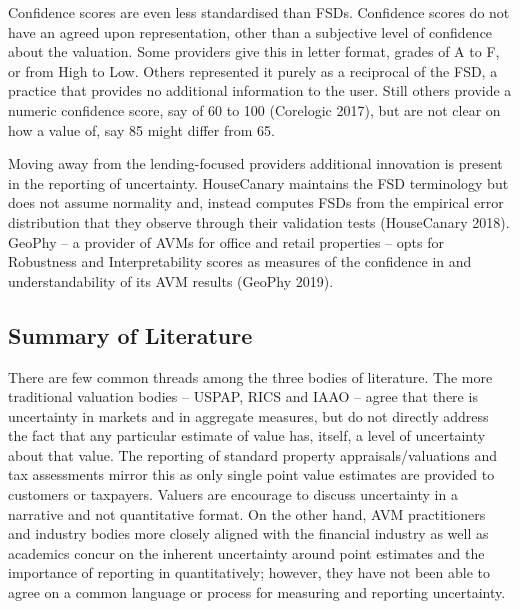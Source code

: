 \documentclass[colTwo]{anon}
\theoremstyle{definition}
\begin{document}
Confidence scores are even less standardised than FSDs.  Confidence scores do not have an agreed upon representation, other than a subjective level of confidence about the valuation.  Some providers give this in letter format, grades of A to F, or from High to Low.  Others represented it purely as a reciprocal of the FSD, a practice that provides no additional information to the user.  Still others provide a numeric confidence score, say of 60 to 100 (Corelogic 2017), but are not clear on how a value of, say 85 might differ from 65.

Moving away from the lending-focused providers additional innovation is present in the reporting of uncertainty.  HouseCanary maintains the FSD terminology but does not assume normality and, instead computes FSDs from the empirical error distribution that they observe through their validation tests (HouseCanary 2018).  GeoPhy -- a provider of AVMs for office and retail properties -- opts for Robustness and Interpretability scores as measures of the confidence in and understandability of its AVM results (GeoPhy 2019).

\subsection{Summary of Literature}

There are few common threads among the three bodies of literature.  The more traditional valuation bodies -- USPAP, RICS and IAAO -- agree that there is uncertainty in markets and in aggregate measures, but do not directly address the fact that any particular estimate of value has, itself, a level of uncertainty about that value.  The reporting of standard property appraisals/valuations and tax assessments mirror this as only single point value estimates are provided to customers or taxpayers. Valuers are encourage to discuss uncertainty in a narrative and not quantitative format. On the other hand, AVM practitioners and industry bodies more closely aligned with the financial industry as well as academics concur on the inherent uncertainty around point estimates and the importance of reporting in quantitatively; however, they have not been able to agree on a common language or process for measuring and reporting uncertainty.
\end{document}

